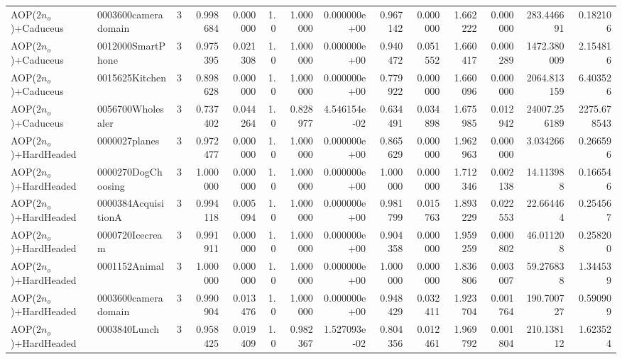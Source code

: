\begin{tabular}{llrr|r|rr|rr|rr|rrr}
    AOP($2 n_o$)+Caduceus &    0003600cameradomain &       3 & 0.998684 & 0.000000 &  1.0 &      1.000000 & 0.000000e+00 &      0.967142 & 0.000000 &      1.662222 &    0.000000 &   283.446691 &    0.182106 \\
    AOP($2 n_o$)+Caduceus &      0012000SmartPhone &       3 & 0.975395 & 0.021308 &  1.0 &      1.000000 & 0.000000e+00 &      0.940472 & 0.051552 &      1.660417 &    0.000289 &  1472.380009 &    2.154816 \\
    AOP($2 n_o$)+Caduceus &         0015625Kitchen &       3 & 0.898628 & 0.000000 &  1.0 &      1.000000 & 0.000000e+00 &      0.779922 & 0.000000 &      1.660096 &    0.000000 &  2064.813159 &    6.403526 \\
    AOP($2 n_o$)+Caduceus &      0056700Wholesaler &       3 & 0.737402 & 0.044264 &  1.0 &      0.828977 & 4.546154e-02 &      0.634491 & 0.034898 &      1.675985 &    0.012942 & 24007.256189 & 2275.678543 \\
  AOP($2 n_o$)+HardHeaded &          0000027planes &       3 & 0.972477 & 0.000000 &  1.0 &      1.000000 & 0.000000e+00 &      0.865629 & 0.000000 &      1.962963 &    0.000000 &     3.034266 &    0.266596 \\
  AOP($2 n_o$)+HardHeaded &     0000270DogChoosing &       3 & 1.000000 & 0.000000 &  1.0 &      1.000000 & 0.000000e+00 &      1.000000 & 0.000000 &      1.712346 &    0.002138 &    14.113988 &    0.166546 \\
  AOP($2 n_o$)+HardHeaded &    0000384AcquisitionA &       3 & 0.994118 & 0.005094 &  1.0 &      1.000000 & 0.000000e+00 &      0.981799 & 0.015763 &      1.893229 &    0.022553 &    22.664464 &    0.254567 \\
  AOP($2 n_o$)+HardHeaded &        0000720Icecream &       3 & 0.991911 & 0.000000 &  1.0 &      1.000000 & 0.000000e+00 &      0.904358 & 0.000000 &      1.959259 &    0.000802 &    46.011208 &    0.258200 \\
  AOP($2 n_o$)+HardHeaded &          0001152Animal &       3 & 1.000000 & 0.000000 &  1.0 &      1.000000 & 0.000000e+00 &      1.000000 & 0.000000 &      1.836806 &    0.003007 &    59.276838 &    1.344539 \\
  AOP($2 n_o$)+HardHeaded &    0003600cameradomain &       3 & 0.990904 & 0.013476 &  1.0 &      1.000000 & 0.000000e+00 &      0.948429 & 0.032411 &      1.923704 &    0.001764 &   190.700727 &    0.590909 \\
  AOP($2 n_o$)+HardHeaded &           0003840Lunch &       3 & 0.958425 & 0.019409 &  1.0 &      0.982367 & 1.527093e-02 &      0.804356 & 0.012461 &      1.969792 &    0.001804 &   210.138112 &    1.623524 \\

\end{tabular}
